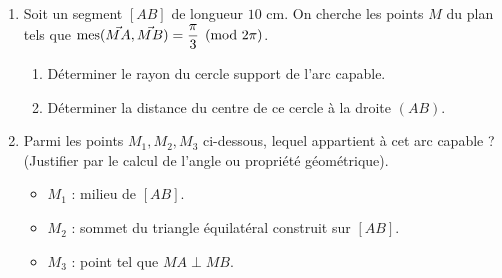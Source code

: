 \documentclass[11pt]{article}
\begin{document}
\begin{exercice}
\begin{enumerate}
    \item Soit un segment $[AB]$ de longueur $10$ cm. On cherche les points $M$ du plan tels que $\operatorname{mes}(\vec{MA}, \vec{MB}) = \dfrac{\pi}{3} \pmod{2\pi}$.
    \begin{enumerate}
        \item Déterminer le rayon du cercle support de l'arc capable.
        \item Déterminer la distance du centre de ce cercle à la droite $(AB)$.
    \end{enumerate}
    \item Parmi les points $M_1, M_2, M_3$ ci-dessous, lequel appartient à cet arc capable ? (Justifier par le calcul de l'angle ou propriété géométrique).
    \begin{itemize}
        \item $M_1$ : milieu de $[AB]$.
        \item $M_2$ : sommet du triangle équilatéral construit sur $[AB]$.
        \item $M_3$ : point tel que $MA \perp MB$.
    \end{itemize}
\end{enumerate}
\end{exercice}
\end{document}
